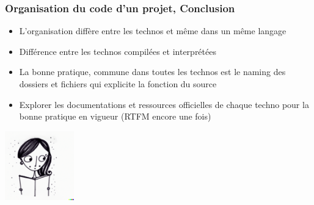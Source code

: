 \documentclass{beamer}
\begin{document}
    \begin{frame}
        \transdissolve
        \frametitle{Organisation du code d'un projet, Conclusion}

        \begin{itemize}

            \item L'organisation diffère entre les technos et même dans un même langage
            \item Différence entre les technos compilées et interprétées
            \item La bonne pratique, commune dans toutes les technos est le naming des dossiers et fichiers qui explicite la fonction du source
            \item Explorer les documentations et ressources officielles de chaque techno pour la bonne pratique en vigueur (RTFM encore une fois)

        \end{itemize}

        \centering
        \includegraphics[width=3cm]{image/girl-reading-doc.png}

    \end{frame}
\end{document}
